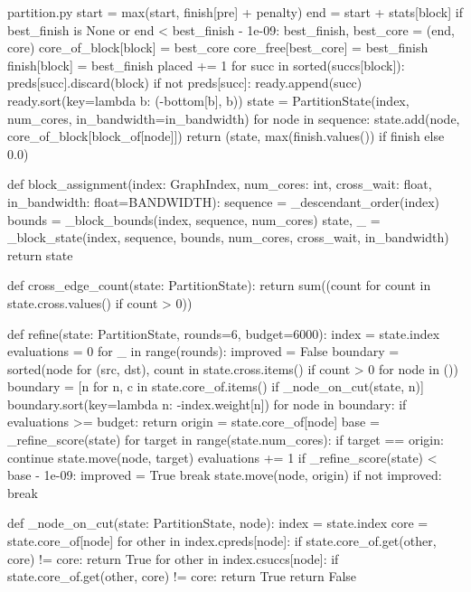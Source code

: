 \begin{Python}{partition.py}
                    start = max(start, finish[pre] + penalty)
            end = start + stats[block]
            if best_finish is None or end < best_finish - 1e-09:
                best_finish, best_core = (end, core)
        core_of_block[block] = best_core
        core_free[best_core] = best_finish
        finish[block] = best_finish
        placed += 1
        for succ in sorted(succs[block]):
            preds[succ].discard(block)
            if not preds[succ]:
                ready.append(succ)
        ready.sort(key=lambda b: (-bottom[b], b))
    state = PartitionState(index, num_cores, in_bandwidth=in_bandwidth)
    for node in sequence:
        state.add(node, core_of_block[block_of[node]])
    return (state, max(finish.values()) if finish else 0.0)

def block_assignment(index: GraphIndex, num_cores: int, cross_wait: float, in_bandwidth: float=BANDWIDTH):
    sequence = _descendant_order(index)
    bounds = _block_bounds(index, sequence, num_cores)
    state, _ = _block_state(index, sequence, bounds, num_cores, cross_wait, in_bandwidth)
    return state

def cross_edge_count(state: PartitionState):
    return sum((count for count in state.cross.values() if count > 0))

def refine(state: PartitionState, rounds=6, budget=6000):
    index = state.index
    evaluations = 0
    for _ in range(rounds):
        improved = False
        boundary = sorted({node for (src, dst), count in state.cross.items() if count > 0 for node in ()})
        boundary = [n for n, c in state.core_of.items() if _node_on_cut(state, n)]
        boundary.sort(key=lambda n: -index.weight[n])
        for node in boundary:
            if evaluations >= budget:
                return
            origin = state.core_of[node]
            base = _refine_score(state)
            for target in range(state.num_cores):
                if target == origin:
                    continue
                state.move(node, target)
                evaluations += 1
                if _refine_score(state) < base - 1e-09:
                    improved = True
                    break
                state.move(node, origin)
        if not improved:
            break

def _node_on_cut(state: PartitionState, node):
    index = state.index
    core = state.core_of[node]
    for other in index.cpreds[node]:
        if state.core_of.get(other, core) != core:
            return True
    for other in index.csuccs[node]:
        if state.core_of.get(other, core) != core:
            return True
    return False


\end{Python}
